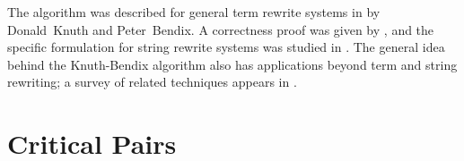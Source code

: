 \documentclass[../generics]{subfiles}
\begin{document}

The algorithm was described for general term rewrite systems in \cite{Knuth1983} by Donald~Knuth and Peter~Bendix. A correctness proof was given by \cite{HUET198111}, and the specific formulation for string rewrite systems was studied in \cite{narendran}. The general idea behind the Knuth-Bendix algorithm also has applications beyond term and string rewriting; a survey of related techniques appears in \cite{BUCHBERGER19873}.


\newcommand{\AssocIntro}[2]{\protosym{#1}.\texttt{#2}\Rightarrow\assocsym{#1}{#2}}
\newcommand{\AssocIntroInv}[2]{\assocsym{#1}{#2}\Rightarrow\protosym{#1}.\texttt{#2}}

\newcommand{\InheritAssocIntro}[3]{\protosym{#1}.\assocsym{#2}{#3}\Rightarrow\assocsym{#1}{#3}}
\newcommand{\InheritAssocIntroInv}[3]{\assocsym{#1}{#3}\Rightarrow\protosym{#1}.\assocsym{#2}{#3}}

\newcommand{\ProtoConf}[2]{#1.\protosym{#2}\Rightarrow #1}
\newcommand{\ProtoConfInv}[2]{#1\Rightarrow #1.\protosym{#2}}

\newcommand{\ProtoInherit}[2]{\ProtoConf{\protosym{#1}}{#2}}
\newcommand{\ProtoInheritInv}[2]{\ProtoConfInv{\protosym{#1}}{#2}}

\newcommand{\FourLoopDerived}[8]{%
\begin{tikzcd}[ampersand replacement=\&]%
\&#1\arrow[ld, Rightarrow, "#5"', bend right]\&\\
#2\arrow[rd, Rightarrow, "#6"', bend right, dashed]\&\&#4\arrow[lu, Rightarrow,"#8"', bend right]\\
\&#3\arrow[ru, Rightarrow, "#7"', bend right]\&
\end{tikzcd}}
\newcommand{\FourLoopTrivial}[8]{%
\begin{tikzcd}[ampersand replacement=\&]%
\&#1\arrow[ld, Rightarrow, "#5"', bend right]\&\\
#2\arrow[rd, Rightarrow, "#6"', bend right]\&\&#4\arrow[lu, Rightarrow,"#8"', bend right]\\
\&#3\arrow[ru, Rightarrow, "#7"', bend right]\&
\end{tikzcd}}

\section{Critical Pairs}\label{critical pairs}
\end{document}
